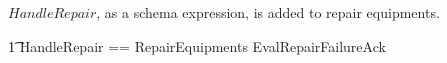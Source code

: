 \documentclass{report} %
\begin{document}
$HandleRepair$, as a schema expression, is added to repair equipments.
\begin{zed}
    \t1 HandleRepair == RepairEquipments \land EvalRepairFailureAck \\
\end{zed}
\end{document}

